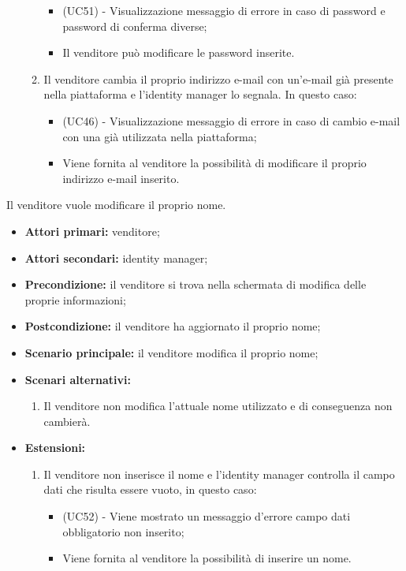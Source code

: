 \begin{itemize}
\begin{enumerate}[label=\lett]
\begin{itemize}
    		\item (UC51) - Visualizzazione messaggio di errore in caso di password e password di conferma diverse;
    		\item Il venditore può modificare le password inserite.
    	\end{itemize}
    	\item Il venditore cambia il proprio indirizzo e-mail con un'e-mail già presente nella piattaforma e l'identity manager lo segnala. In questo caso:
    	\begin{itemize}
    		\item (UC46) - Visualizzazione messaggio di errore in caso di cambio e-mail con una già utilizzata nella piattaforma;
    		\item Viene fornita al venditore la possibilità di modificare il proprio indirizzo e-mail inserito.
    	\end{itemize}
    \end{enumerate}
\end{itemize}

\resetSubUC

Il venditore vuole modificare il proprio nome.
\begin{itemize}
	\item \textbf{Attori primari:} venditore;
	\item \textbf{Attori secondari:} identity manager;
	\item \textbf{Precondizione:} il venditore si trova nella schermata di modifica delle proprie informazioni;
	\item \textbf{Postcondizione:} il venditore ha aggiornato il proprio nome;
	\item \textbf{Scenario principale:} il venditore modifica il proprio nome;
	\item \textbf{Scenari alternativi:}
	\begin{enumerate}[label=\lett]
		\item Il venditore non modifica l'attuale nome utilizzato e di conseguenza non cambierà.
	\end{enumerate}
	\item \textbf{Estensioni:}
	\begin{enumerate}[label=\lett]
		\item Il venditore non inserisce il nome e l'identity manager controlla il campo dati che risulta essere vuoto, in questo caso:
		\begin{itemize}
			\item (UC52) - Viene mostrato un messaggio d'errore campo dati obbligatorio non inserito;
			\item Viene fornita al venditore la possibilità di inserire un nome.
		\end{itemize}
	\end{enumerate} 
\end{itemize}

